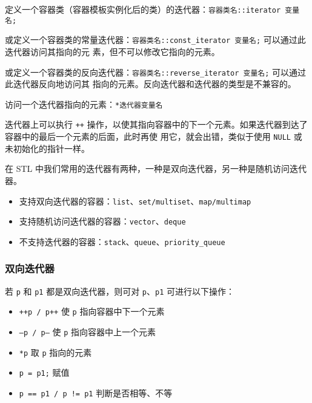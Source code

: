 \documentclass[UTF8]{ctexart}
\begin{document}
定义一个容器类（容器模板实例化后的类）的迭代器：\texttt{容器类名::iterator 变量名;}

或定义一个容器类的常量迭代器：\texttt{容器类名::const_iterator 变量名;} 可以通过此迭代器访问其指向的元
素，但不可以修改它指向的元素。

或定义一个容器类的反向迭代器：\texttt{容器类名::reverse_iterator 变量名;} 可以通过此迭代器反向地访问其
指向的元素。反向迭代器和迭代器的类型是不兼容的。

访问一个迭代器指向的元素：\texttt{*迭代器变量名}

迭代器上可以执行 \texttt{++} 操作，以使其指向容器中的下一个元素。如果迭代器到达了容器中的最后一个元素的后面，此时再使
用它，就会出错，类似于使用 \texttt{NULL} 或未初始化的指针一样。

在 STL 中我们常用的迭代器有两种，一种是双向迭代器，另一种是随机访问迭代器。
\begin{itemize}
    \item 支持双向迭代器的容器：\texttt{list}、\texttt{set/multiset}、\texttt{map/multimap}
    \item 支持随机访问迭代器的容器：\texttt{vector}、\texttt{deque}
    \item 不支持迭代器的容器：\texttt{stack}、\texttt{queue}、\texttt{priority\_queue}
\end{itemize}

\subsubsection{双向迭代器}
若 \texttt{p} 和 \texttt{p1} 都是双向迭代器，则可对 \texttt{p}、\texttt{p1} 可进行以下操作：
\begin{itemize}
    \item \texttt{++p / p++} 使 \texttt{p} 指向容器中下一个元素
    \item \texttt{--p / p--} 使 \texttt{p} 指向容器中上一个元素
    \item \texttt{*p} 取 \texttt{p} 指向的元素
    \item \texttt{p = p1;} 赋值
    \item \texttt{p == p1 / p != p1} 判断是否相等、不等
\end{itemize}
\end{document}
